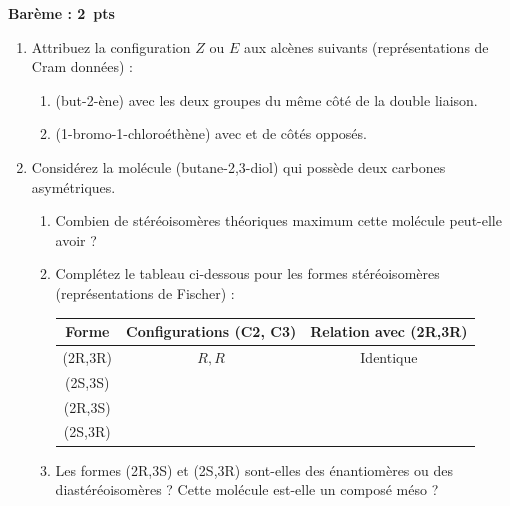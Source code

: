 \documentclass[11pt]{article}
\begin{document}
\providecommand{\bareme}[1]{\par\textbf{Barème : #1~pts}\par}
\begin{exercice}
\bareme{2}
\begin{enumerate}
    \item Attribuez la configuration $Z$ ou $E$ aux alcènes suivants (représentations de Cram données) :
    \begin{enumerate}
        \item {} (but-2-ène) avec les deux groupes  du même côté de la double liaison.
        \item {} (1-bromo-1-chloroéthène) avec  et  de côtés opposés.
    \end{enumerate}
    \item Considérez la molécule  (butane-2,3-diol) qui possède deux carbones asymétriques.
    \begin{enumerate}
        \item Combien de stéréoisomères théoriques maximum cette molécule peut-elle avoir ?
        \item Complétez le tableau ci-dessous pour les formes stéréoisomères (représentations de Fischer) :
        \begin{center}
        \begin{tabular}{|c|c|c|}
        \hline
        \textbf{Forme} & \textbf{Configurations (C2, C3)} & \textbf{Relation avec (2R,3R)} \\ \hline
        (2R,3R) & $R, R$ & Identique \\ \hline
        (2S,3S) &  &  \\ \hline
        (2R,3S) &  &  \\ \hline
        (2S,3R) &  &  \\ \hline
        \end{tabular}
        \end{center}
        \item Les formes (2R,3S) et (2S,3R) sont-elles des énantiomères ou des diastéréoisomères ? Cette molécule est-elle un composé méso ?
    \end{enumerate}
\end{enumerate}
\end{exercice}
\end{document}
